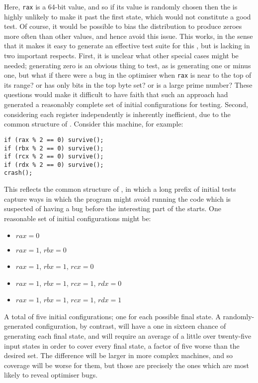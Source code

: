 Here, \verb|rax| is a 64-bit value, and so if its value is randomly
chosen then the {\StateMachine} is highly unlikely to make it past the
first state, which would not constitute a good test.  Of course, it
would be possible to bias the distribution to produce zeroes more
often than other values, and hence avoid this issue.  This works, in
the sense that it makes it easy to generate an effective test suite
for this \StateMachine, but is lacking in two important respects.
First, it is unclear what other special cases might be needed;
generating zero is an obvious thing to test, as is generating one or
minus one, but what if there were a bug in the optimiser when
\verb|rax| is near to the top of its range?  or has only bits in the
top byte set?  or is a large prime number?  These questions would make
it difficult to have faith that such an approach had generated a
reasonably complete set of initial configurations for testing.
Second, considering each register independently is inherently
inefficient, due to the common structure of \StateMachines.  Consider
this machine, for example:

\begin{verbatim}
if (rax % 2 == 0) survive();
if (rbx % 2 == 0) survive();
if (rcx % 2 == 0) survive();
if (rdx % 2 == 0) survive();
crash();
\end{verbatim}

This reflects the common structure of \StateMachines, in which a long
prefix of initial tests capture ways in which the program might avoid
running the code which is suspected of having a bug before the
interesting part of the \StateMachine starts.  One reasonable set of
initial configurations might be:

\begin{itemize}
\item $rax = 0$
\item $rax = 1$, $rbx = 0$
\item $rax = 1$, $rbx = 1$, $rcx = 0$
\item $rax = 1$, $rbx = 1$, $rcx = 1$, $rdx = 0$
\item $rax = 1$, $rbx = 1$, $rcx = 1$, $rdx = 1$
\end{itemize}

A total of five initial configurations; one for each possible final
state.  A randomly-generated configuration, by contrast, will have a
one in sixteen chance of generating each final state, and will require
an average of a little over twenty-five input states in order to cover
every final state, a factor of five worse than the desired
set.  The difference will be larger in
more complex machines, and so coverage will be worse for them, but
those are precisely the ones which are most likely to reveal optimiser
bugs.

